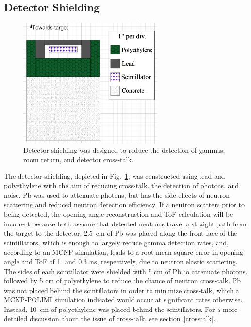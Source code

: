 \subsection{Detector Shielding}
\label{shielding}
\begin{figure}
    \centering
    \includegraphics[width = 0.65\textwidth]{Content/Methods/DetShielding.png}
    \caption{Detector shielding was designed to reduce the detection of gammas, room return, and detector cross-talk.}
    \label{fig:shielding}
\end{figure}
The detector shielding, depicted in Fig.~\ref{fig:shielding}, was constructed using lead and polyethylene with the aim of reducing cross-talk, the detection of photons, and noise.
Pb was used to attenuate photons, but has the side effects of neutron scattering and reduced neutron detection efficiency.
If a neutron scatters prior to being detected, the opening angle reconstruction and ToF calculation will be incorrect because both assume that detected neutrons travel a straight path from the target to the detector.
2.5~cm of Pb was placed along the front face of the scintillators, which is enough to largely reduce gamma detection rates, and, according to an MCNP simulation, leads to a root-mean-square error in opening angle and ToF of 1$^{\circ}$ and 0.3~ns, respectively, due to neutron elastic scattering.
The sides of each scintillator were shielded with 5 cm of Pb to attenuate photons, followed by 5 cm of polyethylene to reduce the chance of neutron cross-talk.
Pb was not placed behind the scintillators in order to minimize cross-talk, which a MCNP-POLIMI simulation indicated would occur at significant rates otherwise.
Instead, 10~cm of polyethylene was placed behind the scintillators.
For a more detailed discussion about the issue of cross-talk, see section~\ref{crosstalk}.

